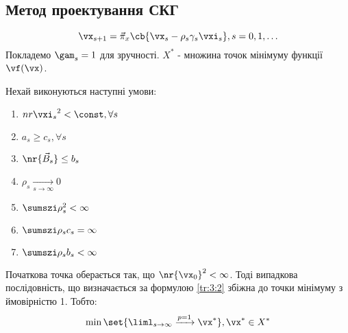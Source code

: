 \subsection{Метод проектування СКГ}
\begin{equation}\label{tr:3:2}
\vx_{s+1} = \vec{\pi}_x\cb{\vx_s - \rho_s\gamma_s\vxi_s},s=0,1,\ldots
\end{equation}
Покладемо $\gam_s=1$ для зручності. $X^\ast$ - множина точок мінімуму функції $\vf(\vx)$.
\begin{teor}
Нехай виконуються наступні умови:
\begin{enumerate}
\item $nr{\vxi_s}^2 < \const,\forall s$
\item $a_s \geq c_s,\forall s$
\item $\nr{\vec{B}_s} \leq b_s $
\item $\rho_s \xrightarrow[s\to\infty]{}0$
\item $\sumszi \rho_s^2 < \infty$
\item $\sumszi \rho_s c_s = \infty$
\item $\sumszi \rho_s b_s < \infty$
\end{enumerate}
Початкова точка оберається так, що $\nr{\vx_0}^2 < \infty$. Тоді випадкова послідовність, що визначається за формулою \eqref{tr:3:2} збіжна до точки мінімуму з ймовірністю 1. Тобто:
\begin{equation*}
\min\set{\liml_{s\to\infty} \xrightarrow{p=1} \vx^\ast},\vx^\ast\in X^\ast
\end{equation*}
\end{teor}
